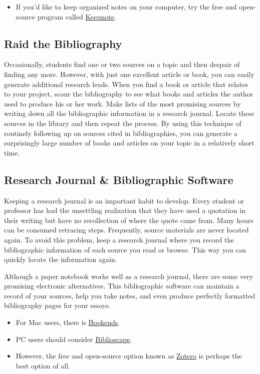\begin{itemize}
\item If you'd like to keep organized notes on your computer, try the free and open-source
program called \href{http://rasm.ods.org/keepnote}{Keepnote}.
\end{itemize}

\subsection{Raid the Bibliography}

Occasionally, students find one or two sources on a topic and then despair of
finding any more. However, with just one excellent article or book, you can
easily generate additional research leads. When you find a book or article that
relates to your project, scour the bibliography to see what books and articles
the author used to produce his or her work. Make lists of the most promising
sources by writing down all the bibliographic information in a research
journal. Locate these sources in the library and then repeat the process. By
using this technique of routinely following up on sources cited in
bibliographies, you can generate a surprisingly large number of books and
articles on your topic in a relatively short time.

\subsection{Research Journal \& Bibliographic Software}

Keeping a research journal is an important habit to develop. Every student or
professor has had the unsettling realization that they have used a quotation in
their writing but have no recollection of where the quote came from. Many hours
can be consumed retracing steps. Frequently, source materials are never located
again. To avoid this problem, keep a research journal where you record the
bibliographic information of each source you read or browse. This way you can
quickly locate the information again.

Although a paper notebook works well as a research journal, there are some very
promising electronic alternatives. This bibliographic software can maintain a
record of your sources, help you take notes, and even produce perfectly
formatted bibliography pages for your essays.  \begin{itemize}\item For Mac
users, there is \href{http://www.sonnysoftware.com/}{Bookends}.  \item PC users
should consider \href{http://www.biblioscape.com}{Biblioscape}.  \item However,
the free and open-source option known as \href{http://zotero.org}{Zotero} is
perhaps the best option of all. \end{itemize}
